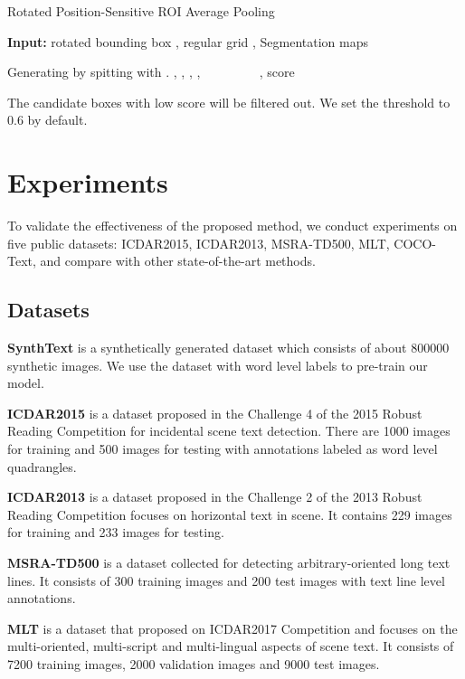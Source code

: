 \documentclass[10pt,twocolumn,letterpaper]{article}
\begin{document}
\begin{algorithm}[t]
\caption{Rotated Position-Sensitive ROI Average Pooling} 
\hspace*{0.02in} {\bf Input:} 
rotated bounding box ,  regular grid , Segmentation maps  
\begin{algorithmic}[1]
\State Generating  by spitting  with . 
\State , 
	\State , , , 	\State  
　　　　		\State , 
		\EndIf
	\EndFor
	\State 
\EndFor
\State 
\State \Return score
\end{algorithmic}
\label{algo_rps}
\end{algorithm}

The candidate boxes with low score will be filtered out. We set the threshold  to 0.6 by default.

\section{Experiments}
To validate the effectiveness of the proposed method, we conduct experiments on five public datasets: ICDAR2015, ICDAR2013, MSRA-TD500, MLT, COCO-Text, and compare with other state-of-the-art methods.

\subsection{Datasets}
\textbf{SynthText} \cite{gupta2016synthetic} is a synthetically generated dataset which consists of about 800000 synthetic images.   We use the dataset with word level labels to pre-train our model.

\textbf{ICDAR2015} is a dataset proposed in the Challenge 4 of the 2015 Robust Reading Competition \cite{karatzas2015icdar} for incidental scene text detection. There are 1000 images for training  and 500 images for testing with annotations labeled as word level quadrangles.

\textbf{ICDAR2013} is a dataset proposed in the Challenge 2  of the 2013 Robust Reading Competition \cite{karatzas2013icdar} focuses on horizontal text in scene. It contains 229 images for training and 233 images for testing.

\textbf{MSRA-TD500} \cite{yao2012detecting} is a dataset collected for detecting arbitrary-oriented long text lines. It consists of 300 training images and 200 test images with text line level annotations.

\textbf{MLT}  is a dataset that proposed on ICDAR2017 Competition \cite{MLT-Challenge} and  focuses on the multi-oriented, multi-script and multi-lingual aspects of scene text. It consists of 7200 training images, 2000 validation images and 9000 test images. 
\end{document}
